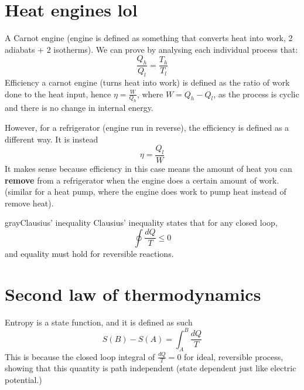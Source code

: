 \documentclass[12pt,a4paper]{extreport}
\numberwithin{equation}{chapter}
\begin{document}
     \section{Heat engines lol}
     A Carnot engine (engine is defined as something that converts heat into work, 2 adiabats + 2 isotherms). We can prove by analysing each individual process that:
     \begin{equation}
         \frac{Q_h}{Q_l}=\frac{T_h}{T_l}
     \end{equation}
     Efficiency a carnot engine (turns heat into work) is defined as the ratio of work done to the heat input, hence $\eta=\frac{W}{Q_h}$, where $W=Q_h-Q_l$, as the process is cyclic and there is no change in internal energy. 
     
     \begin{flushleft}
         However, for a refrigerator (engine run in reverse), the efficiency is defined as a different way. It is instead 
         \begin{equation}
             \eta=\frac{Q_l}{W}
         \end{equation}
         It makes sense because efficiency in this case means the amount of heat you can \textbf{remove} from a refrigerator when the engine does a certain amount of work. (similar for a heat pump, where the engine does work to pump heat instead of remove heat).
     \end{flushleft}
     
     \begin{mybox}{gray}{Clausius' inequality}
        Clausius' inequality states that for any closed loop, 
        \begin{equation}
            \oint \frac{dQ}{T} \leq 0
        \end{equation}
        and equality must hold for reversible reactions. 
     \end{mybox}
     
    \section{Second law of thermodynamics}
    Entropy is a state function, and it is defined as such
    \begin{equation}
        S(B)-S(A)=\int_A^B \frac{dQ}{T}
    \end{equation}
    This is because the closed loop integral of $\frac{dQ}{T}=0$ for ideal, reversible process, showing that this quantity is path independent (state dependent just like electric potential.) 
    
\end{document}
